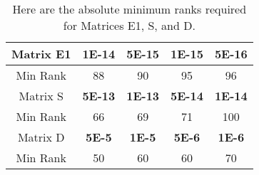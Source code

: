 
\begin{table}
\begin{center}
\begin{tabular}{|c|c|c|c|c|}
\hline
Matrix E1 & \textbf{1E-14} & \textbf{5E-15} & \textbf{1E-15} & \textbf{5E-16} \\
\hline
Min Rank  & 88 & 90 & 95 & 96 \\
\hline
\hline
Matrix S  & \textbf{5E-13} & \textbf{1E-13} & \textbf{5E-14} & \textbf{1E-14} \\
\hline
Min Rank  & 66 & 69 & 71 & 100 \\
\hline
\hline
Matrix D  & \textbf{5E-5} & \textbf{1E-5} & \textbf{5E-6} & \textbf{1E-6} \\
\hline
Min Rank  & 50 & 60 & 60 & 70 \\
\hline
\hline
\end{tabular}
\end{center}
\caption[QB Adaptive Test: Minimum Rank (Stringent GEB Test)]{
Here are the absolute minimum ranks required for Matrices E1, S, and D.
}
\label{tab:results_qb_min_rank_tough_geb}
\end{table}
